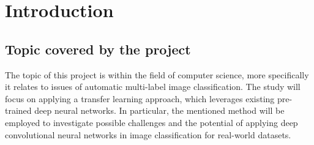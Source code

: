 \chapter{Introduction}
\label{chap:introduction}

\section{Topic covered by the project}
The topic of this project is within the field of computer science, more specifically it relates to issues of automatic multi-label image classification. The study will focus on applying a transfer learning approach, which leverages existing pre-trained deep neural networks. In particular, the mentioned method will be employed to investigate possible challenges and the potential of applying deep convolutional neural networks in image classification for real-world datasets.






